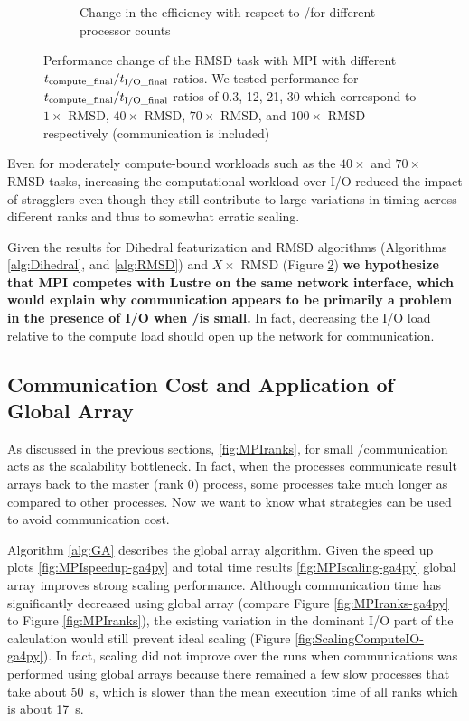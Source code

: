 \begin{figure}
\begin{subfigure}{.3\textwidth}
  \caption{Change in the efficiency with respect to \tcomp/\tIO for different processor counts}
  \label{fig:E_tcomp_tIO_effect}
\end{subfigure}
%
\caption{Performance change of the RMSD task with MPI with different ${t}_{\text{compute\_final}}/{t}_{\text{I/O\_final}}$ ratios. We tested performance for ${t}_{\text{compute\_final}}/{t}_{\text{I/O\_final}}$ ratios of 0.3, 12, 21, 30
which correspond to $1\times$ RMSD, $40\times$ RMSD, $70\times$ RMSD, and $100\times$ RMSD respectively (communication is included)}
\label{fig:tcomp_tIO_effect}
\end{figure}

Even for moderately compute-bound workloads such
as the $40\times$ and $70\times$ RMSD tasks, increasing the computational workload over I/O reduced the impact of stragglers even
though they still contribute to large variations in timing across different ranks and thus to somewhat erratic scaling. 

Given the results for Dihedral featurization and RMSD algorithms (Algorithms \ref{alg:Dihedral}, and \ref{alg:RMSD}) and $X\times$ RMSD (Figure \ref{fig:tcomp_tIO_effect})
\textbf{we hypothesize that MPI competes with Lustre on the same network interface, which would explain why communication appears to
  be primarily a problem in the presence of I/O when \tcomp/\tIO is small.}
In fact, decreasing the I/O load relative to the compute load should open up the network for communication. 

\subsection{Communication Cost and Application of Global Array}
\label{Global-Array}
As discussed in the previous sections, \ref{fig:MPIranks}, for small \tcomp/\tIO communication acts as the scalability bottleneck. 
In fact, when the processes communicate result arrays back to the master (rank 0) process, some processes take much longer as compared to other processes. 
Now we want to know what strategies can be used to avoid communication cost. 

Algorithm \ref{alg:GA} describes the global array algorithm. 
Given the speed up plots \ref{fig:MPIspeedup-ga4py} and total time results \ref{fig:MPIscaling-ga4py} global array improves strong scaling performance.
Although communication time has significantly decreased using global array (compare Figure \ref{fig:MPIranks-ga4py} to Figure \ref{fig:MPIranks}),
the existing variation in the dominant I/O part of the calculation would still prevent ideal scaling (Figure \ref{fig:ScalingComputeIO-ga4py}).
In fact, scaling did not improve over the runs when communications was performed using global arrays because there remained a few slow processes
that take about 50~s, which is slower than the mean execution time of all ranks which is about 17~s. 

